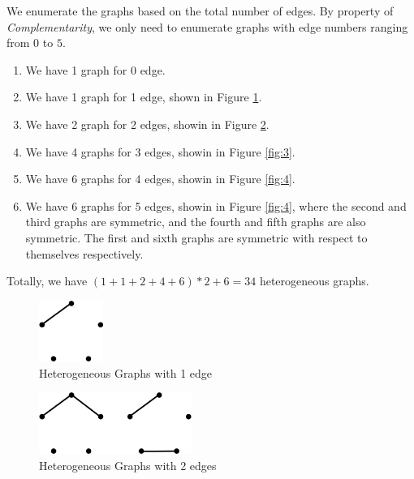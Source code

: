 \documentclass{oxmathproblems}
\begin{document}
\vspace{-15mm}

We enumerate the graphs based on the total number of edges. By property of \emph{Complementarity}, we only need to enumerate graphs with edge numbers ranging from $0$ to $5$.

\begin{enumerate}
    \item We have 1 graph for 0 edge.
    \item We have 1 graph for 1 edge, shown in Figure \ref{fig:1}.
    \item We have 2 graph for 2 edges, showin in Figure \ref{fig:2}.
    \item We have 4 graphs for 3 edges, showin in Figure \ref{fig:3}.
    \item We have 6 graphs for 4 edges, showin in Figure \ref{fig:4}.
    \item We have 6 graphs for 5 edges, showin in Figure \ref{fig:4}, where the second and third graphs are symmetric, and the fourth and fifth graphs are also symmetric. The first and sixth graphs are symmetric with respect to themselves respectively.
\end{enumerate}

Totally, we have $(1+1+2+4+6)*2 + 6 = 34 $ heterogeneous graphs.

\begin{figure}[hb]
  \begin{center}
  \includegraphics[height=2cm]{img/4-1.png}
  \caption{Heterogeneous Graphs with 1 edge}
  \label{fig:1}
  \end{center}
\end{figure}


\begin{figure}[hb]
    \begin{center}
    \includegraphics[height=2cm]{img/4-2.png}
    \caption{Heterogeneous Graphs with 2 edges}
    \label{fig:2}
    \end{center}
\end{figure}
\end{document}
